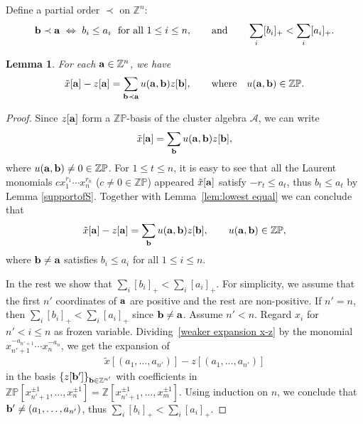 \documentclass[pdftex]{sigma}
\numberwithin{equation}{section}
\newtheorem{Lemma}[Theorem]{Lemma}
\begin{document}
Def\/ine a partial order $\prec$ on $\mathbb{Z}^n$:
\begin{gather*}%
{\bf b} \prec {\bf a} \  \Leftrightarrow\  b_i\le a_i  \ \ \textrm{for all}  \ 1\le i\le n, \qquad \text{and} \qquad \sum_i[b_i]_+<\sum_i [a_i]_+.
\end{gather*}

\begin{Lemma}\label{lem:xinz}
For each ${\bf a} \in \mathbb{Z}^n$, we have
\begin{gather*}%
\tilde{x}[{\bf a}] - z[{\bf a}] = \sum_{{\bf b} \prec {\bf a}} u({\bf a},{\bf b}) z[{\bf b}], \qquad
\text{where} \quad u({\bf a},{\bf b}) \in \mathbb{ZP}.
\end{gather*}
\end{Lemma}

\begin{proof}
Since $z[{\bf a}]$ form a $\mathbb{ZP}$-basis of the cluster algebra  $\mathcal{A}$, we can write
\begin{gather*}%
\tilde{x}[{\bf a}] = \sum_{{\bf b}} u({\bf a},{\bf b}) z[{\bf b}],
\end{gather*}
where $u({\bf a},{\bf b})\neq 0\in\mathbb{ZP}$.
For $1\le t\le n$, it is easy to see that all the Laurent monomials $cx_1^{r_1}\cdots x_n^{r_n}$ ($c\neq0\in\mathbb{ZP}$) appeared $\tilde{x}[{\bf a}]$ satisfy $-r_t\le a_t$, thus  $b_t\le a_t$ by Lemma \ref{supportofS}.
Together with Lemma~\ref{lem:lowest equal} we can conclude that
\begin{gather}\label{weaker expansion x-z}
\tilde{x}[{\bf a}] - z[{\bf a}] = \sum_{\bf b} u({\bf a},{\bf b}) z[{\bf b}], \qquad u({\bf a},{\bf b}) \in \mathbb{ZP},
\end{gather}
where ${\bf b}\neq{\bf a}$ satisf\/ies $b_i\le a_i$ for all $1\le i\le n$.

In the rest we show that $\sum\limits_i[b_i]_+<\sum\limits_i [a_i]_+$. For simplicity, we assume that the f\/irst $n'$ coordinates of ${\bf a}$ are positive and the rest are non-positive. If $n'=n$, then $\sum\limits_i[b_i]_+<\sum\limits_i [a_i]_+$ since ${\bf b}\neq{\bf a}$. Assume $n'<n$. Regard $x_i$ for $n'<i\le n$ as frozen variable. Dividing~\eqref{weaker expansion x-z} by the monomial $x_{n'+1}^{-a_{n'+1}}\cdots x_{n}^{-a_{n}}$, we get the expansion of \begin{gather*}
\tilde{x}[(a_1,\dots,a_{n'})] - z[(a_1,\dots,a_{n'})]
 \end{gather*}
 in the basis $\{z[{\bf b}']\}_{{\bf b}\in\mathbb{Z}^{n'}}$ with coef\/f\/icients in $\mathbb{ZP}[x_{n'+1}^{\pm1},\dots, x_n^{\pm1}]=\mathbb{Z}[x_{n'+1}^{\pm1},\dots, x_m^{\pm1}]$. Using induction on $n$, we conclude that ${\bf b}'\neq(a_1,\dots,a_{n'})$, thus $\sum\limits_i[b_i]_+<\sum\limits_i [a_i]_+$.
\end{proof}
\end{document}
